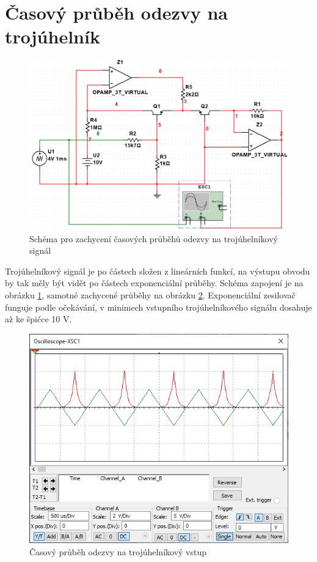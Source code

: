\documentclass[twoside]{article}
\begin{document}
\section{Časový průběh odezvy na trojúhelník}

\begin{figure}[h!]
    \centering
    \includegraphics[width=0.6\linewidth]{prubeh_schema.png}
    \caption{Schéma pro zachycení časových průběhů odezvy na trojúhelníkový signál}
    \label{fig:prubeh_schema}
\end{figure}

Trojúhelníkový signál je po částech složen z lineárních funkcí,
na výstupu obvodu by tak měly být vidět po částech exponenciální průběhy.
Schéma zapojení je na obrázku \ref{fig:prubeh_schema}, samotné zachycené 
průběhy na obrázku \ref{fig:prubeh}.
Exponenciální zesilovač funguje podle očekávání, v minimech vstupního trojúhelníkového signálu
dosahuje až ke špičce 10 V.

\begin{figure}[h!]
    \centering
    \includegraphics[width=0.6\linewidth]{prubeh.png}
    \caption{Časový průběh odezvy na trojúhelníkový vstup}
    \label{fig:prubeh}
\end{figure}
\end{document}
